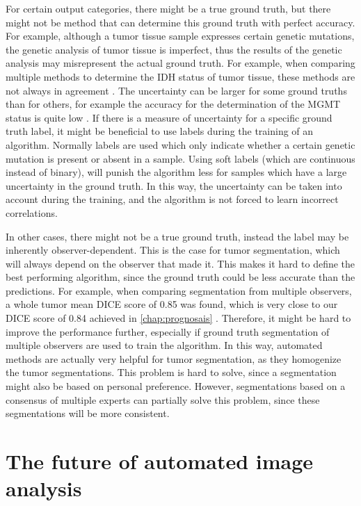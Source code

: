For certain output categories, there might be a true ground truth, but there might not be method that can determine this ground truth with perfect accuracy.
For example, although a \gls{tumor} tissue sample expresses certain genetic mutations, the genetic analysis of \gls{tumor} tissue is imperfect, thus the results of the genetic analysis may misrepresent the actual ground truth.
For example, when comparing multiple methods to determine the \gls{IDH} status of \gls{tumor} tissue, these methods are not always in agreement \autocite{pyo2016concordance}.
The uncertainty can be larger for some ground truths than for others, for example the accuracy for the determination of the \gls{MGMT} status is quite low \autocite{wang2017mgmt}.
If there is a measure of uncertainty for a specific ground truth label, it might be beneficial to use  labels during the training of an algorithm.
Normally labels are used which only indicate whether a certain genetic mutation is present or absent in a sample.
Using soft labels (which are continuous instead of binary), will punish the algorithm less for samples which have a large uncertainty in the ground truth.
In this way, the uncertainty can be taken into account during the training, and the algorithm is not forced to learn incorrect correlations.

In other cases, there might not be a true ground truth, instead the label may be inherently observer-dependent.
This is the case for \gls{tumor} segmentation, which will always depend on the observer that made it.
This makes it hard to define the best performing algorithm, since the ground truth could be less accurate than the predictions.
For example, when comparing segmentation from multiple observers, a whole \gls{tumor} mean DICE score of 0.85 was found, which is very close to our DICE score of 0.84 achieved in \cref{chap:prognosais} \autocite{menze2015brats}.
Therefore, it might be hard to improve the performance further, especially if ground truth segmentation of multiple observers are used to train the algorithm.
In this way, automated methods are actually very helpful for \gls{tumor} segmentation, as they homogenize the \gls{tumor} segmentations.
This problem is hard to solve, since a segmentation might also be based on personal preference.
However, segmentations based on a consensus of multiple experts can partially solve this problem, since these segmentations will be more consistent.

\section{The future of automated image analysis}\label{sec:discussion_future}

